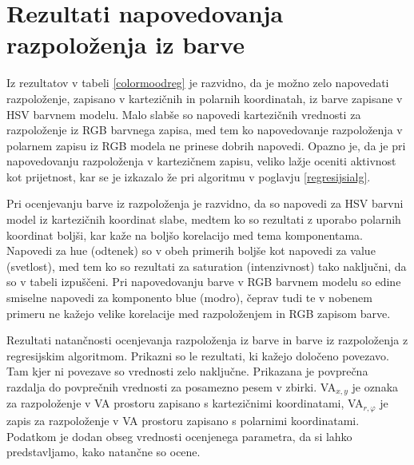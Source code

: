 \documentclass[a4paper, 12pt]{book}
\begin{document}
{\section{Rezultati napovedovanja razpoloženja iz barve}

Iz rezultatov v tabeli \ref{colormoodreg} je razvidno, da je možno zelo napovedati razpoloženje, zapisano v kartezičnih in polarnih koordinatah, iz barve zapisane v HSV barvnem modelu. Malo slabše so napovedi kartezičnih vrednosti za razpoloženje iz RGB barvnega zapisa, med tem ko napovedovanje razpoloženja v polarnem zapisu iz RGB modela ne prinese dobrih napovedi. Opazno je, da je pri napovedovanju razpoloženja v kartezičnem zapisu, veliko lažje oceniti aktivnost kot prijetnost, kar se je izkazalo že pri algoritmu v poglavju \ref{regresijsialg}. 

Pri ocenjevanju barve iz razpoloženja je razvidno, da so napovedi za HSV barvni model iz kartezičnih koordinat slabe, medtem ko so rezultati z uporabo polarnih koordinat boljši, kar kaže na boljšo korelacijo med tema komponentama. Napovedi za hue (odtenek) so v obeh primerih boljše kot napovedi za value (svetlost), med tem ko so rezultati za saturation (intenzivnost) tako naključni, da so v tabeli izpuščeni. Pri napovedovanju barve v RGB barvnem modelu so edine smiselne napovedi za komponento blue (modro), čeprav tudi te v nobenem primeru ne kažejo velike korelacije med razpoloženjem in RGB zapisom barve. 

\begin{table}[hbt]
\begin{center}

\caption{Rezultati natančnosti ocenjevanja razpoloženja iz barve in barve iz razpoloženja z regresijskim algoritmom. Prikazni so le rezultati, ki kažejo določeno povezavo. Tam kjer ni povezave so vrednosti zelo naključne. Prikazana je povprečna razdalja do povprečnih vrednosti za posamezno pesem v zbirki. VA$_{x,y}$ je oznaka za razpoloženje v VA prostoru zapisano s kartezičnimi koordinatami, VA$_{r,\varphi}$ je zapis za razpoloženje v VA prostoru zapisano s polarnimi koordinatami. Podatkom je dodan obseg vrednosti ocenjenega parametra, da si lahko predstavljamo, kako natančne so ocene. }


\end{center}
\end{table}}
\end{document}
